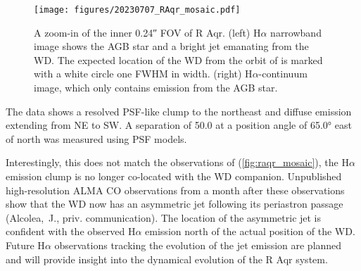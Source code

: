 \begin{figure}[h]
    \centering
    \texttt{[image: figures/20230707\_RAqr\_mosaic.pdf]}
    \caption{A zoom-in of the inner \ang{;;0.24} FOV of R Aqr. (left) H$\alpha$ narrowband image shows the AGB star and a bright jet emanating from the WD. The expected location of the WD from the orbit of \citet{alcolea_determining_2023} is marked with a white circle one FWHM in width. (right) H$\alpha$-continuum image, which only contains emission from the AGB star.\label{fig:raqr_mosaic}}
\end{figure}

The data shows a resolved PSF-like clump to the northeast and diffuse emission extending from NE to SW. A separation of \SI{50.0}{\mas} at a position angle of \ang{65.0} east of north was measured using PSF models. 

Interestingly, this does not match the observations of \citet{bujarrabal_high-resolution_2018,alcolea_determining_2023} (\autoref{fig:raqr_mosaic}), the H$\alpha$ emission clump is no longer co-located with the WD companion. Unpublished high-resolution ALMA CO observations from a month after these observations show that the WD now has an asymmetric jet following its periastron passage (Alcolea,~J., priv. communication). The location of the asymmetric jet is confident with the observed H$\alpha$ emission north of the actual position of the WD. Future H$\alpha$ observations tracking the evolution of the jet emission are planned and will provide insight into the dynamical evolution of the R Aqr system.
